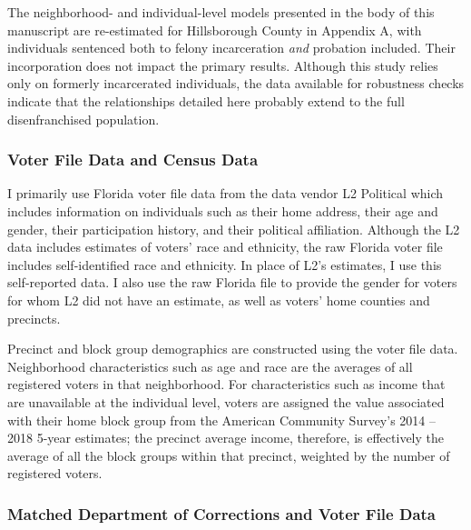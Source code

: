 \documentclass[
  12pt,
]{article}
\begin{document}
The neighborhood- and individual-level models presented in the body of this manuscript are re-estimated for Hillsborough County in Appendix A, with individuals sentenced both to felony incarceration \emph{and} probation included. Their incorporation does not impact the primary results. Although this study relies only on formerly incarcerated individuals, the data available for robustness checks indicate that the relationships detailed here probably extend to the full disenfranchised population.

\hypertarget{voter-file-data-and-census-data}{%
\subsubsection*{Voter File Data and Census Data}\label{voter-file-data-and-census-data}}

I primarily use Florida voter file data from the data vendor L2 Political which includes information on individuals such as their home address, their age and gender, their participation history, and their political affiliation. Although the L2 data includes estimates of voters' race and ethnicity, the raw Florida voter file includes self-identified race and ethnicity. In place of L2's estimates, I use this self-reported data. I also use the raw Florida file to provide the gender for voters for whom L2 did not have an estimate, as well as voters' home counties and precincts.

Precinct and block group demographics are constructed using the voter file data. Neighborhood characteristics such as age and race are the averages of all registered voters in that neighborhood. For characteristics such as income that are unavailable at the individual level, voters are assigned the value associated with their home block group from the American Community Survey's 2014 -- 2018 5-year estimates; the precinct average income, therefore, is effectively the average of all the block groups within that precinct, weighted by the number of registered voters.

\hypertarget{matched-department-of-corrections-and-voter-file-data}{%
\subsubsection*{Matched Department of Corrections and Voter File Data}\label{matched-department-of-corrections-and-voter-file-data}}
\end{document}
